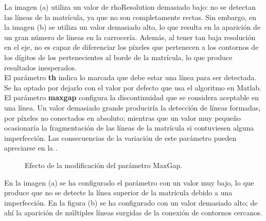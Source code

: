 La imagen (a) utiliza un valor de rhoResolution demasiado bajo: no se detectan las líneas de la matrícula, ya que no son completamente rectas. Sin embargo, en la imagen (b) se utiliza un valor demasiado alto, lo que resulta en la aparición de un gran número de líneas en la carrocería. Además, al tener tan baja resolución en el eje, no es capaz de diferenciar los píxeles que pertenecen a los contornos de los dígitos de los pertenecientes al borde de la matrícula, lo que produce resultados inesperados. \\

El parámetro \textbf{th} indica lo marcada que debe estar una línea para ser detectada. Se ha optado por dejarlo con el valor por defecto que usa el algoritmo en Matlab.\\

El parámetro \textbf{maxgap} configura la discontinuidad que se considera aceptable en una línea. Un valor demasiado grande produciría la detección de líneas formadas, por píxeles no conectados en absoluto; mientras que un valor muy pequeño ocasionaría la fragmentación de las líneas de la matrícula si contuviesen alguna imperfección. Las consecuencias de la variación de este parámetro pueden apreciarse en la . 

\begin{figure}[!h]
\centering {}
\caption{\small{Efecto de la modificación del parámetro MaxGap.}} \label{cambioMaxgap}
\end{figure} 

En la imagen (a) se ha configurado el parámetro con un valor muy bajo, lo que produce que no se detecte la línea superior de la matrícula debido a una imperfección. En la figura (b) se ha configurado con un valor demasiado alto; de ahí la aparición de múltiples líneas surgidas de la conexión de contornos cercanos.  \\

